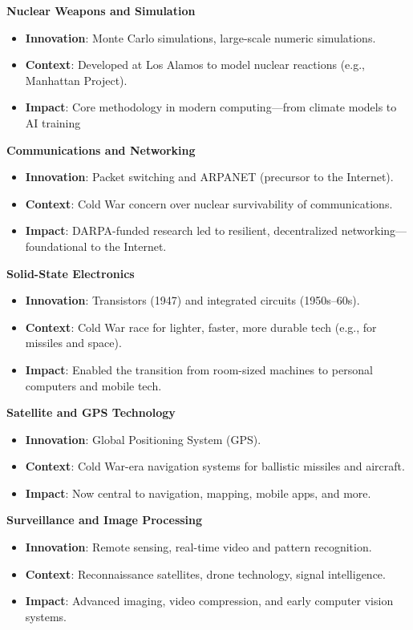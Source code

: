 \textbf{Nuclear Weapons and Simulation}
\begin{itemize}
	\item \textbf{Innovation}: Monte Carlo simulations, large-scale numeric simulations.
	\item \textbf{Context}: Developed at Los Alamos to model nuclear reactions (e.g., Manhattan Project).
	\item \textbf{Impact}: Core methodology in modern computing—from climate models to AI training \cite{MonteCarloMethod1949}
\end{itemize}

\textbf{Communications and Networking}
\begin{itemize}
	\item \textbf{Innovation}: Packet switching and ARPANET (precursor to the Internet).
	\item \textbf{Context}: Cold War concern over nuclear survivability of communications.
	\item \textbf{Impact}: DARPA-funded research led to resilient, decentralized networking—foundational to the Internet. \cite{Leiner2009}
\end{itemize}

\textbf{Solid-State Electronics}
\begin{itemize}
	\item \textbf{Innovation}: Transistors (1947) and integrated circuits (1950s–60s).
	\item \textbf{Context}: Cold War race for lighter, faster, more durable tech (e.g., for missiles and space).
	\item \textbf{Impact}: Enabled the transition from room-sized machines to personal computers and mobile tech. \cite{RiordanHoddeson1997}
\end{itemize}

\textbf{Satellite and GPS Technology}
\begin{itemize}
	\item \textbf{Innovation}: Global Positioning System (GPS).
	\item \textbf{Context}: Cold War-era navigation systems for ballistic missiles and aircraft.
	\item \textbf{Impact}: Now central to navigation, mapping, mobile apps, and more. \cite{Pace1995}
\end{itemize}

\textbf{Surveillance and Image Processing}
\begin{itemize}
	\item \textbf{Innovation}: Remote sensing, real-time video and pattern recognition.
	\item \textbf{Context}: Reconnaissance satellites, drone technology, signal intelligence.
	\item \textbf{Impact}: Advanced imaging, video compression, and early computer vision systems. \cite{Krick1971}
\end{itemize}

